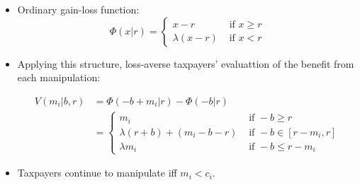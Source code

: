 \documentclass[dvipdfmx,12pt]{beamer}
\begin{document}
\begin{frame}
  \begin{itemize}
    \item Ordinary gain-loss function:
    \[
    \Phi(x|r) = \begin{cases}
    x-r & \text{ if } x \geq r \\
    \lambda (x-r) & \text{ if } x < r
  \end{cases}
  \]

    \item Applying this structure, loss-averse taxpayers' evaluattion
    of the benefit from each manipulation:

    \begin{align*}
      V(m_i | b, r) &= \Phi(-b + m_i | r) - \Phi(-b | r) \\
       &= \begin{cases}
       m_i & \text{ if } -b \geq r \\
       \lambda(r+b)+(m_i -b -r) & \text{ if } -b \in [r-m_i, r] \\
       \lambda m_i & \text{ if } -b \leq r - m_i
       \end{cases}
    \end{align*}

    \item Taxpayers continue to manipulate iff $m_i < c_i$.
  \end{itemize}
\end{frame}
\end{document}
